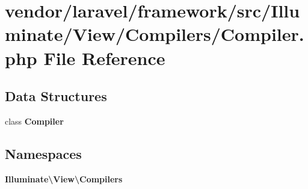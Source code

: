 \section{vendor/laravel/framework/src/\+Illuminate/\+View/\+Compilers/\+Compiler.php File Reference}
\label{laravel_2framework_2src_2_illuminate_2_view_2_compilers_2_compiler_8php}
\subsection*{Data Structures}
\begin{DoxyCompactItemize}
\item 
class {\bf Compiler}
\end{DoxyCompactItemize}
\subsection*{Namespaces}
\begin{DoxyCompactItemize}
\item 
 {\bf Illuminate\textbackslash{}\+View\textbackslash{}\+Compilers}
\end{DoxyCompactItemize}

